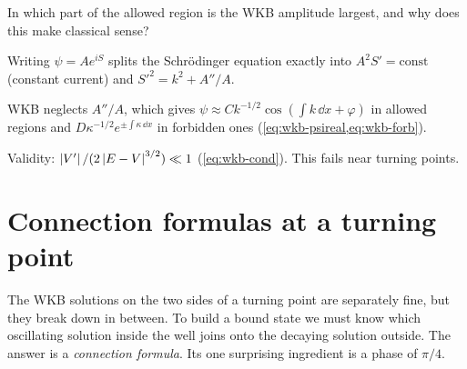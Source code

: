 \begin{checkpoint}
In which part of the allowed region is the WKB amplitude largest, and why does this make classical sense?
\end{checkpoint}

\begin{keyideas}
\item Writing $\psi=Ae^{iS}$ splits the Schr\"odinger equation exactly into $A^2S'=\text{const}$ (constant current) and $S'^2=k^2+A''/A$.
\item WKB neglects $A''/A$, which gives $\psi\approx Ck^{-1/2}\cos(\int k\,\dd x+\varphi)$ in allowed regions and $D\kappa^{-1/2}e^{\pm\int\kappa\,\dd x}$ in forbidden ones (\cref{eq:wkb-psireal,eq:wkb-forb}).
\item Validity: $\left\lvert V'\right\rvert/(2\left\lvert E-V\right\rvert^{3/2})\ll1$ (\cref{eq:wkb-cond}). This fails near turning points.
\end{keyideas}

\section{Connection formulas at a turning point}\label{sec:wkb-connection}

The WKB solutions on the two sides of a turning point are separately fine, but they break down in between. To build a bound state we must know which oscillating solution inside the well joins onto the decaying solution outside. The answer is a \emph{connection formula}. Its one surprising ingredient is a phase of $\pi/4$.

